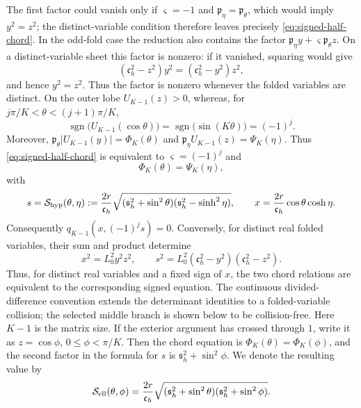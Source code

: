 \documentclass[preprints,article,accept,oneauthor]{Definitions/mdpi}
\numberwithin{equation}{section}
\newcounter{result}[section]
\theoremstyle{mdpi}
\theoremstyle{definition}
\begin{document}
The first factor could vanish only if \(\varsigma=-1\) and
\(\mathfrak p_\eta=\mathfrak p_\theta\), which would imply
\(y^2=z^2\); the distinct-variable condition therefore leaves precisely
\eqref{eq:signed-half-chord}.  In the odd-fold case the reduction also
contains the factor
\(\mathfrak p_\eta y+\varsigma\mathfrak p_\theta z\).  On a
distinct-variable sheet this factor is nonzero: if it vanished, squaring
would give
\[
 (\mathfrak c_h^2-z^2)y^2=(\mathfrak c_h^2-y^2)z^2,
\]
and hence \(y^2=z^2\).  Thus the factor is nonzero whenever the folded
variables are distinct.  On the outer lobe
\(U_{K-1}(z)>0\), whereas, for
\(j\pi/K<\theta<(j+1)\pi/K\),
\[
 \operatorname{sgn}\bigl(U_{K-1}(\cos\theta)\bigr)
 =\operatorname{sgn}\bigl(\sin(K\theta)\bigr)=(-1)^j.
\]
Moreover,
\(\mathfrak p_\theta|U_{K-1}(y)|=\Phi_K(\theta)\) and
\(\mathfrak p_\eta U_{K-1}(z)=\Psi_K(\eta)\).  Thus
\eqref{eq:signed-half-chord} is equivalent to
\(\varsigma=(-1)^j\) and
\begin{equation}\label{eq:chord-equation}
 \Phi_K(\theta)=\Psi_K(\eta),
\end{equation}
with
\begin{equation}\label{eq:channel-xs}
 s=\mathcal S_{\rm hyp}(\theta,\eta)
 :=\frac{2r}{\mathfrak c_h}
 \sqrt{(\mathfrak s_h^2+\sin^2\theta)
       (\mathfrak s_h^2-\sinh^2\eta)},\qquad
 x=\frac{2r}{\mathfrak c_h}\cos\theta\cosh\eta.
\end{equation}
Consequently \(q_{K-1}(x,(-1)^j s)=0\).  Conversely, for distinct real
folded variables, their sum and product determine
\[
 x^2=L_0^2y^2z^2,\qquad
 s^2=L_0^2(\mathfrak c_h^2-y^2)(\mathfrak c_h^2-z^2).
\]
Thus, for distinct real variables and a fixed sign of \(x\), the two chord
relations are equivalent to the corresponding signed equation.  The
continuous divided-difference convention extends the determinant identities
to a folded-variable collision; the selected middle branch is shown below to
be collision-free.
Here \(K-1\) is the matrix size.  If the exterior argument has crossed
through \(1\), write it as \(z=\cos\phi\),
\(0\leq\phi<\pi/K\).  Then the chord equation is
\(\Phi_K(\theta)=\Phi_K(\phi)\), and the second factor in the formula
for \(s\) is \(\mathfrak s_h^2+\sin^2\phi\).  We denote the resulting
value by
\[
 \mathcal S_{\rm ell}(\theta,\phi)
 =\frac{2r}{\mathfrak c_h}
 \sqrt{(\mathfrak s_h^2+\sin^2\theta)
       (\mathfrak s_h^2+\sin^2\phi)}.
\]
\end{document}
